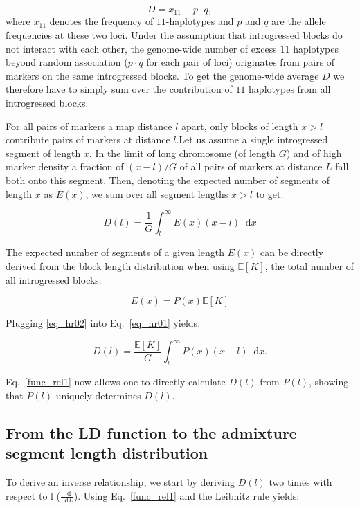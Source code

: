 \documentclass[11pt]{article}
\newcommand*\diff{\mathop{}\!\mathrm{d}}
\begin{document}
\begin{equation}
D = x_{11} - p \cdot q,
\end{equation}
where $x_{11}$ denotes the frequency of $11$-haplotypes and $p$ and $q$ are the allele frequencies at these two loci. Under the assumption that introgressed blocks do not interact with each other, the genome-wide number of excess $11$ haplotypes beyond random association ($p\cdot q$ for each pair of loci) originates from pairs of markers on the same introgressed blocks. To get the genome-wide average $D$ we therefore have to simply sum over the contribution of $11$ haplotypes from all introgressed blocks.

For all pairs of markers a map distance $l$ apart, only blocks of length $x>l$ contribute pairs of markers at distance $l$.Let us assume a single introgressed segment of length $x$. In the limit of long chromosome (of length $G$) and of high marker density a fraction of $(x-l)/G$ of all pairs of markers at distance $L$ fall both onto this segment. Then, denoting the expected number of segments of length $x$ as $E(x)$, we sum over all segment lengths $x>l$ to get:

\begin{equation}
D(l) = \frac{1}{G} \int_l^\infty E(x) (x-l) \diff x
\label{eq_hr01}
\end{equation}

The expected number of segments of a given length $E(x)$ can be directly derived from the block length distribution when using $\mathbb{E}[K]$, the total number of all introgressed blocks:

\begin{equation}
E(x) = P(x) \mathbb{E}[K]
\label{eq_hr02}
\end{equation} 

Plugging \ref{eq_hr02} into Eq.~\ref{eq_hr01} yields:

\begin{equation}
D(l) = \frac{\mathbb{E}[K]}{G} \int_l^\infty P(x) (x-l) \diff x.
\label{func_rel1}
\end{equation}

Eq.~\ref{func_rel1} now allows one to directly calculate $D(l)$ from $P(l)$, showing that $P(l)$ uniquely determines $D(l)$. 

\subsection{From the LD function to the admixture segment length distribution}
To derive an inverse relationship, we start by deriving $D(l)$ two times with respect to l ($\frac{\diff}{\diff L}$). Using Eq.~\ref{func_rel1} and the Leibnitz rule yields:
\end{document}
